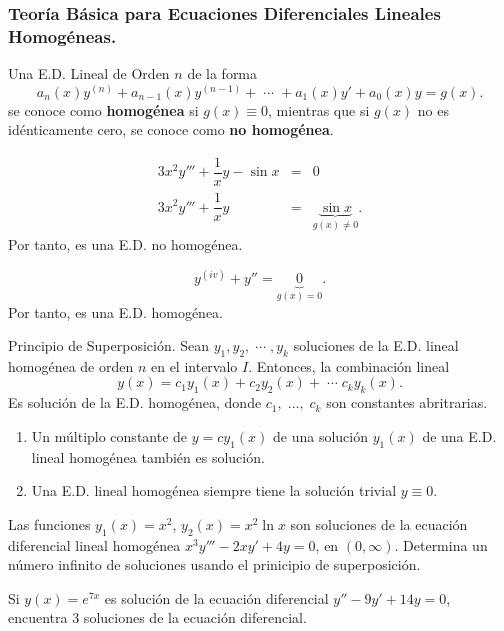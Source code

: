\documentclass{beamer}
\begin{document}
\frame{\titlepage}

\begin{frame}[t]
	\frametitle{Teoría Básica para Ecuaciones Diferenciales Lineales Homogéneas.}
\begin{definition}
	Una E.D. Lineal de Orden \(n\) de la forma
	\[
		a_n(x) y^{(n)} +a_{n-1} (x) y^{(n-1)} + \;\cdots\; + a_1(x) y' +a_0(x) y = g(x).
	\]
	se conoce como \textbf{homogénea} si \(g(x) \equiv 0\), mientras que si \(g(x)\) no es idénticamente cero, se conoce como \textbf{no homogénea}.
\end{definition}
	\begin{example}
		\[
			\begin{array}{rcl}
				3x^2y''' + \dfrac{1}{x} y - \sin x & = & 0 \\[2mm]
				3x^2y''' + \dfrac{1}{x} y & = & \underbrace{\sin x} _{g(x) \ne 0} .
			\end{array}
		\]
		Por tanto, es una E.D. no homogénea.
	\end{example}
\end{frame}

\begin{frame}[t]
	\begin{example}
		\[
			y^{(iv)} +y'' = \underbrace{0} _{g(x) =0}.
		\]
		Por tanto, es una E.D. homogénea.
	\end{example} 
	\begin{block}{Principio de Superposición.}
		Sean \(y_1,y_2, \;\cdots\; ,y_k\) soluciones de la E.D. lineal homogénea de orden \(n\) en el intervalo \(I\). Entonces, la combinación lineal
		\[
			y(x) = c_1y_1(x) + c_2y_2(x) + \;\cdots\; c_ky_k(x).
		\]
		Es solución de la E.D. homogénea, donde \(c_1, \;\ldots,\; c_k\) son constantes abritrarias.
	\end{block}
\end{frame}

\begin{frame}[t]
	\begin{corollary}
		\begin{enumerate}
			\item Un múltiplo constante de \(y=cy_1(x)\) de una solución \(y_1(x)\) de una E.D. lineal homogénea también es solución.
			\item Una E.D. lineal homogénea siempre tiene la solución trivial \(y \equiv 0\).
		\end{enumerate}
	\end{corollary} 
	\begin{example}
		Las funciones \(y_1(x) = x^2\), \(y_2(x) =x^2 \ln x\) son soluciones de la ecuación diferencial lineal homogénea \(x^3y''' -2xy' +4y=0\), en \((0, \infty)\). Determina un número infinito de soluciones usando el prinicipio de superposición.
	\end{example}
	\begin{example}
		Si \(y(x) = e^{7x}\) es solución de la ecuación diferencial \(y'' -9y' +14y=0\), encuentra 3 soluciones de la ecuación diferencial.
	\end{example}
\end{frame}
\end{document}

